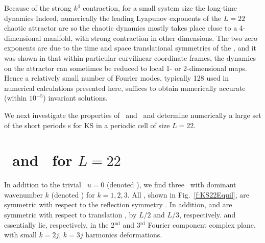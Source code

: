Because of the strong $k^4$ contraction, for a small system
size the long-time dynamics
Indeed, numerically the leading Lyapunov exponents of the
$L=22$ chaotic attractor are
so the chaotic dynamics mostly takes place close to a
4-dimensional manifold, with strong contraction in other
dimensions.  The two zero exponents are due to the time and
space translational symmetries of the \KSe, and it was shown
in  that within particular
curvilinear coordinate frames, the dynamics on the attractor
can sometimes be reduced to local 1- or 2-dimensional maps.
Hence a relatively small number of Fourier modes, typically
128 used in numerical calculations presented here, suffices
to obtain numerically accurate (within $10^{-5}$) invariant
solutions.

We next investigate the properties of \eqva\ and \reqva\ and
determine numerically a large set of the short periods \rpo s
for KS in a periodic cell of size $L=22$.

\section{\Eqva\ and \reqva\ for $L=22$}

In addition to the trivial \eqv\ $u=0$ (denoted ),
we find three \eqva\ with dominant wavenumber $k$
(denoted ) for $k = 1, 2, 3$.  All {\eqva}, shown in
Fig.~\ref{f:KS22Equil}, are symmetric with respect to the reflection
symmetry .
In addition,  and  are symmetric with respect
to translation , by $L/2$ and $L/3$, respectively.
 and  essentially lie, respectively, in
the 2$^\mathrm{nd}$ and 3$^\mathrm{rd}$ Fourier component complex plane,
with small $k=2j$, $k=3j$ harmonics deformations.

